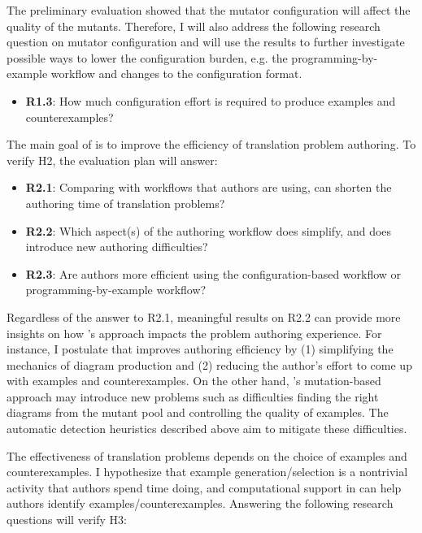 The preliminary evaluation showed that the mutator configuration will affect the quality of the mutants. Therefore, I will also address the following research question on mutator configuration and will use the results to further investigate possible ways to lower the configuration burden, e.g. the programming-by-example workflow and changes to the configuration format.

\begin{itemize}
    \item \textbf{R1.3}: How much configuration effort is required to produce examples and counterexamples? 
\end{itemize}


The main goal of \Edgeworth is to improve the efficiency of translation problem authoring. To verify H2, the evaluation plan will answer:
\begin{itemize}
    \item  \textbf{R2.1}: Comparing with workflows that authors are using, can \Edgeworth shorten the authoring time of translation problems?
    \item  \textbf{R2.2}: Which aspect(s) of the authoring workflow does \Edgeworth simplify, and does \Edgeworth introduce new authoring difficulties? 
    \item  \textbf{R2.3}: Are authors more efficient using the configuration-based workflow or programming-by-example workflow?
\end{itemize}

Regardless of the answer to R2.1, meaningful results on R2.2 can provide more insights on how \Edgeworth's approach impacts the problem authoring experience. For instance, I postulate that \Edgeworth improves authoring efficiency by (1) simplifying the mechanics of diagram production and (2) reducing the author's effort to come up with examples and counterexamples. On the other hand, \Edgeworth's mutation-based approach may introduce new problems such as difficulties finding the right diagrams from the mutant pool and controlling the quality of examples. The automatic detection heuristics described above aim to mitigate these difficulties.


The effectiveness of translation problems depends on the choice of examples and counterexamples. I hypothesize that example generation/selection is a nontrivial activity that authors spend time doing, and computational support in \Edgeworth can help authors identify examples/counterexamples. Answering the following research questions will verify H3:

